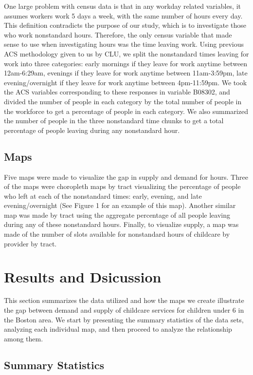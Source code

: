 \documentclass[10pt,letterpaper]{article}
\begin{document}
One large problem with census data is that in any workday related
variables, it assumes workers work 5 days a week, with the same number
of hours every day. This definition contradicts the purpose of our
study, which is to investigate those who work nonstandard hours.
Therefore, the only census variable that made sense to use when
investigating hours was the time leaving work. Using previous ACS
methodology given to us by CLU, we split the nonstandard times leaving
for work into three categories: early mornings if they leave for work
anytime between 12am-6:29am, evenings if they leave for work anytime
between 11am-3:59pm, late evening/overnight if they leave for work
anytime between 4pm-11:59pm. We took the ACS variables corresponding to
these responses in variable B08302, and divided the number of people in
each category by the total number of people in the workforce to get a
percentage of people in each category. We also summarized the number of
people in the three nonstandard time chunks to get a total percentage of
people leaving during any nonstandard hour.

\subsection{Maps}\label{maps-1}

Five maps were made to visualize the gap in supply and demand for hours.
Three of the maps were choropleth maps by tract visualizing the
percentage of people who left at each of the nonstandard times: early,
evening, and late evening/overnight (See Figure 1 for an example of this
map). Another similar map was made by tract using the aggregate
percentage of all people leaving during any of these nonstandard hours.
Finally, to visualize supply, a map was made of the number of slots
available for nonstandard hours of childcare by provider by tract.

\section{Results and Dsicussion}\label{results-and-dsicussion}

This section summarizes the data utilized and how the maps we create
illustrate the gap between demand and supply of childcare services for
children under 6 in the Boston area. We start by presenting the summary
statistics of the data sets, analyzing each individual map, and then
proceed to analyze the relationship among them.

\subsection{Summary Statistics}\label{summary-statistics}
\end{document}
